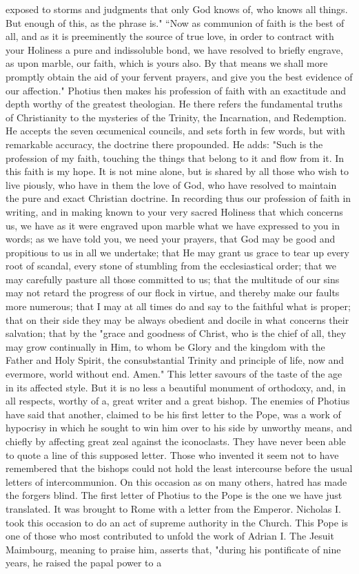 exposed to storms and judgments that only God knows of, who knows all things. But enough of this, as the phrase is." “Now as communion of faith is the best of all, and as it is preeminently the source of true love, in order to contract with your Holiness a pure and indissoluble bond, we have resolved to briefly engrave, as upon marble, our faith, which is yours also. By that means we shall more promptly obtain the aid of your fervent prayers, and give you the best evidence of our affection." Photius then makes his profession of faith with an exactitude and depth worthy of the greatest theologian. He there refers the fundamental truths of Christianity to the mysteries of the Trinity, the Incarnation, and Redemption. He accepts the seven œcumenical councils, and sets forth in few words, but with remarkable accuracy, the doctrine there propounded. He adds: "Such is the profession of my faith, touching the things that belong to it and flow from it. In this faith is my hope. It is not mine alone, but is shared by all those who wish to live piously, who have in them the love of God, who have resolved to maintain the pure and exact Christian doctrine. In recording thus our profession of faith in writing, and in making known to your very sacred Holiness that which concerns us, we have as it were engraved upon marble what we have expressed to you in words; as we have told you, we need your prayers, that God may be good and propitious to us in all we undertake; that He may grant us grace to tear up every root of scandal, every stone of stumbling from the ecclesiastical order; that we may carefully pasture all those committed to us; that the multitude of our sins may not retard the progress of our flock in virtue, and thereby make our faults more numerous; that I may at all times do and say to the faithful what is proper; that on their side they may be always obedient and docile in what concerns their salvation; that by the "grace and goodness of Christ, who is the chief of all, they may grow continually in Him, to whom be Glory and the kingdom with the Father and Holy Spirit, the consubstantial Trinity and principle of life, now and evermore, world without end. Amen." This letter savours of the taste of the age in its affected style. But it is no less a beautiful monument of orthodoxy, and, in all respects, worthy of a, great writer and a great bishop. The enemies of Photius have said that another, claimed to be his first letter to the Pope, was a work of hypocrisy in which he sought to win him over to his side by unworthy means, and chiefly by affecting great zeal against the iconoclasts. They have never been able to quote a line of this supposed letter. Those who invented it seem not to have remembered that the bishops could not hold the least intercourse before the usual letters of intercommunion. On this occasion as on many others, hatred has made the forgers blind. The first letter of Photius to the Pope is the one we have just translated. It was brought to Rome with a letter from the Emperor. Nicholas I. took this occasion to do an act of supreme authority in the Church. This Pope is one of those who most contributed to unfold the work of Adrian I. The Jesuit Maimbourg, meaning to praise him, asserts that, "during his pontificate of nine years, he raised the papal power to a 